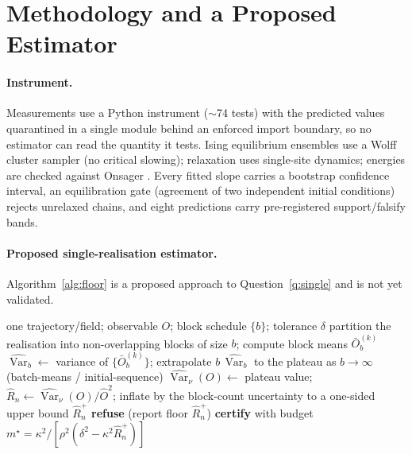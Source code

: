 \documentclass[11pt]{article}
\theoremstyle{definition}
\newcommand{\Var}{\operatorname{Var}}
\begin{document}
\section{Methodology and a Proposed Estimator}\label{sec:method}
\paragraph{Instrument.} Measurements use a Python instrument ($\sim$74 tests) with the predicted values quarantined in a single module behind an enforced import boundary, so no estimator can read the quantity it tests. Ising equilibrium ensembles use a Wolff cluster sampler (no critical slowing); relaxation uses single-site dynamics; energies are checked against Onsager \citep{onsager}. Every fitted slope carries a bootstrap confidence interval, an equilibration gate (agreement of two independent initial conditions) rejects unrelaxed chains, and eight predictions carry pre-registered support/falsify bands.

\paragraph{Proposed single-realisation estimator.} Algorithm~\ref{alg:floor} is a proposed approach to Question~\ref{q:single} and is not yet validated.

\begin{algorithm}[h]
\small
\caption{Conservative single-realisation floor estimate (proposed)}\label{alg:floor}
\begin{algorithmic}[1]
\Require one trajectory/field; observable $O$; block schedule $\{b\}$; tolerance $\delta$
\State partition the realisation into non-overlapping blocks of size $b$; compute block means $\bar O_b^{(k)}$
\State $\widehat{\Var}_b \gets$ variance of $\{\bar O_b^{(k)}\}$; extrapolate $b\,\widehat{\Var}_b$ to the plateau as $b\to\infty$ (batch-means / initial-sequence)
\State $\widehat{\Var}_\nu(O)\gets$ plateau value; $\widehat{R}_n\gets \widehat{\Var}_\nu(O)/\widehat O^2$; inflate by the block-count uncertainty to a one-sided upper bound $\widehat{R}_n^{+}$
 \State \textbf{refuse} (report floor $\widehat{R}_n^{+}$)
\Else{} \State \textbf{certify} with budget $m^\star=\kappa^2/[\rho^2(\delta^2-\kappa^2\widehat{R}_n^{+})]$
\EndIf
\end{algorithmic}
\end{algorithm}
\end{document}
